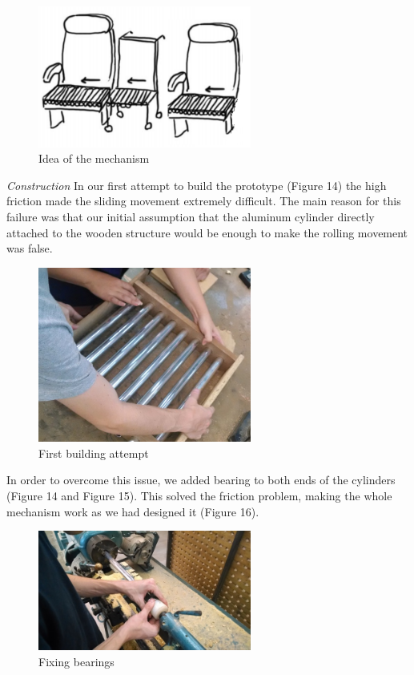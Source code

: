 \begin{figure}[h]
\centering
\includegraphics[width=7cm]{brazil_images/image038.png}
\caption{Idea of the mechanism}
\label{fig:idea_mechanism}
\end{figure}


\emph{Construction}
In our first attempt to build the prototype (Figure 14) the high friction made the sliding movement extremely difficult. The main reason for this failure was that our initial assumption that the aluminum cylinder directly attached to the wooden structure would be enough to make the rolling movement was false. \\

\begin{figure}[h]
\centering
\includegraphics[width=7cm]{brazil_images/image039.jpg}
\caption{First building attempt}
\label{fig:first_attempt}
\end{figure}


In order to overcome this issue, we added bearing to both ends of the cylinders (Figure 14 and Figure 15). This solved the friction problem, making the whole mechanism work as we had designed it (Figure 16).	


\begin{figure}[h]
\centering
\includegraphics[width=7cm]{brazil_images/image040.jpg}
\caption{Fixing bearings}
\label{fig:fixing_bearings}
\end{figure}



